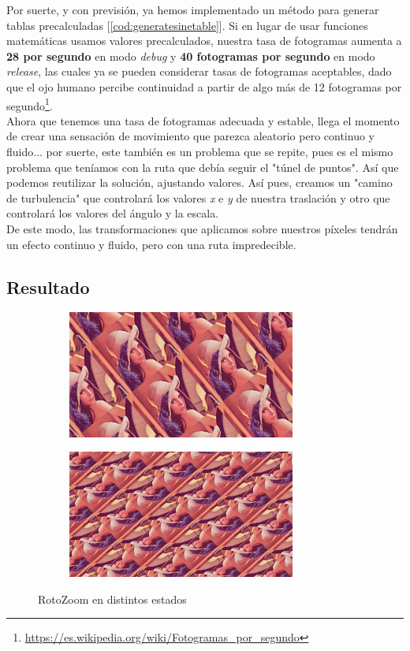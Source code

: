 Por suerte, y con previsión, ya hemos implementado un método para generar tablas precalculadas [\ref{cod:generatesinetable}]. Si en lugar de usar funciones matemáticas usamos valores precalculados, nuestra tasa de fotogramas aumenta a \textbf{28 por segundo} en modo \emph{debug} y \textbf{40 fotogramas por segundo} en modo \emph{release}, las cuales ya se pueden considerar tasas de fotogramas aceptables, dado que el ojo humano percibe continuidad a partir de algo más de 12 fotogramas por segundo\footnote{\url{https://es.wikipedia.org/wiki/Fotogramas_por_segundo}}.\\

Ahora que tenemos una tasa de fotogramas adecuada y estable, llega el momento de crear una sensación de movimiento que parezca aleatorio pero continuo y fluido... por suerte, este también es un problema que se repite, pues es el mismo problema que teníamos con la ruta que debía seguir el "túnel de puntos". Así que podemos reutilizar la solución, ajustando valores. Así pues, creamos un "camino de turbulencia" que controlará los valores \emph{x} e \emph{y} de nuestra traslación y otro que controlará los valores del ángulo y la escala.\\

De este modo, las transformaciones que aplicamos sobre nuestros píxeles tendrán un efecto continuo y fluido, pero con una ruta impredecible.\\

\subsection{Resultado}

\begin{figure}[h]
	\centering
	\begin{subfigure}[b]{0.48\textwidth}
		\centering
		\includegraphics[width=7.5cm]{archivos/rotozoom1}
		\label{fig:rotozoom1}
	\end{subfigure}
	\begin{subfigure}[b]{0.48\textwidth}
		\centering
		\includegraphics[width=7.5cm]{archivos/rotozoom2}
		\label{fig:rotozoom2}
	\end{subfigure}
	\caption{RotoZoom en distintos estados}
\end{figure}

